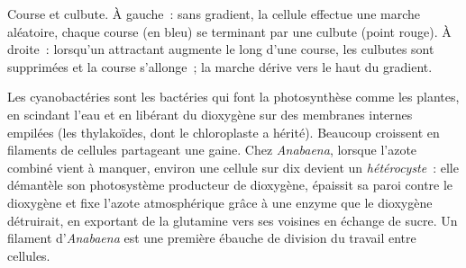\begin{omfigure}

{\small Course et culbute. À gauche~: sans gradient, la cellule effectue
une marche aléatoire, chaque course (en bleu) se terminant par une
culbute (point rouge). À droite~: lorsqu'un attractant augmente le long
d'une course, les culbutes sont supprimées et la course s'allonge~; la
marche dérive vers le haut du gradient.}
\end{omfigure}

\begin{example}\label{ex:b2:unicellular-diversity:cyanobacteria}
Les cyanobactéries sont les bactéries qui font la photosynthèse comme
les plantes, en scindant l'eau et en libérant du dioxygène sur des
membranes internes empilées (les thylakoïdes, dont le chloroplaste a
hérité). Beaucoup croissent en filaments de cellules partageant une
gaine. Chez \emph{Anabaena}, lorsque l'azote combiné vient à manquer,
environ une cellule sur dix devient un \emph{hétérocyste}~: elle
démantèle son photosystème producteur de dioxygène, épaissit sa paroi
contre le dioxygène et fixe l'azote atmosphérique grâce à une enzyme que
le dioxygène détruirait, en exportant de la glutamine vers ses voisines
en échange de sucre. Un filament d'\emph{Anabaena} est une première
ébauche de division du travail entre cellules.
\end{example}


